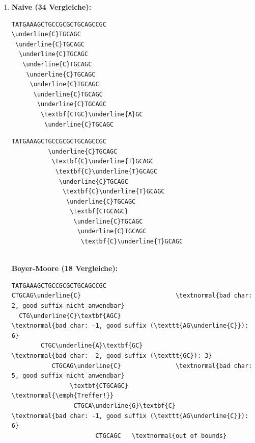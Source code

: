 \documentclass[11pt,a4paper]{article}
\begin{document}
\begin{loesung}
\begin{enumerate}
\begin{table}[h!]
{            }
        \end{table}
        \item \textbf{Naive\textnormal{ (34 Vergleiche)}:}\\
        \begin{minipage}[t]{0.45\textwidth}
        \begin{Verbatim}[commandchars=\\\{\}]
TATGAAAGCTGCCGCGCTGCAGCCGC
\underline{C}TGCAGC
 \underline{C}TGCAGC
  \underline{C}TGCAGC
   \underline{C}TGCAGC
    \underline{C}TGCAGC
     \underline{C}TGCAGC
      \underline{C}TGCAGC
       \underline{C}TGCAGC
        \textbf{CTGC}\underline{A}GC
         \underline{C}TGCAGC
        \end{Verbatim}
        \end{minipage}
        \begin{minipage}[t]{0.45\textwidth}
        \begin{Verbatim}[commandchars=\\\{\}]
TATGAAAGCTGCCGCGCTGCAGCCGC
          \underline{C}TGCAGC
           \textbf{C}\underline{T}GCAGC
            \textbf{C}\underline{T}GCAGC
             \underline{C}TGCAGC
              \textbf{C}\underline{T}GCAGC
               \underline{C}TGCAGC
                \textbf{CTGCAGC}
                 \underline{C}TGCAGC
                  \underline{C}TGCAGC
                   \textbf{C}\underline{T}GCAGC
        \end{Verbatim}
        \end{minipage} \\

        \textbf{Boyer-Moore\textnormal{ (18 Vergleiche)}:}\\
        \begin{minipage}[t]{0.95\textwidth}
        \begin{Verbatim}[commandchars=\\\{\}]
TATGAAAGCTGCCGCGCTGCAGCCGC
CTGCAG\underline{C}                          \textnormal{bad char: 2, good suffix nicht anwendbar}
  CTG\underline{C}\textbf{AGC}                        \textnormal{bad char: -1, good suffix (\texttt{AG\underline{C}}): 6}
        CTGC\underline{A}\textbf{GC}                  \textnormal{bad char: -2, good suffix (\texttt{GC}): 3}
           CTGCAG\underline{C}               \textnormal{bad char: 5, good suffix nicht anwendbar}
                \textbf{CTGCAGC}          \textnormal{\emph{Treffer!}}
                 CTGCA\underline{G}\textbf{C}         \textnormal{bad char: -1, good suffix (\texttt{AG\underline{C}}): 6}
                       CTGCAGC   \textnormal{out of bounds}
        \end{Verbatim}
        \end{minipage}


\end{enumerate}
\end{loesung}
\end{document}
